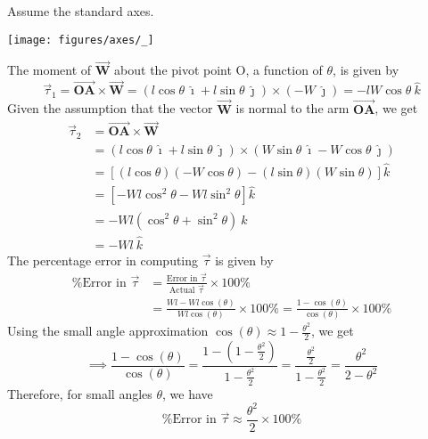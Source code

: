 Assume the standard axes.
\vspace{-2em}
\begin{center}
    \texttt{[image: figures/axes/\_]}
\end{center}
\vspace{-1em}
The moment of \( \vec{\mathbf{W}} \) about the pivot point O, a function of \( \theta \), is given by
\[
    \vec{\tau}_1 = \vec{\mathbf{OA}} \times \vec{\mathbf{W}}
    = (l \cos \theta \ \hat{\imath} + l \sin \theta \ \hat{\jmath}) \times (- W \ \hat{\jmath})
    = -lW \cos \theta \ \hat{k}
\]
Given the assumption that the vector \( \vec{\mathbf{W}} \) is normal to the arm \( \vec{\mathbf{OA}} \), we get
\begin{align*}
    \vec{\tau}_2 & = \vec{\mathbf{OA}} \times \vec{\mathbf{W}}                                                                                                                \\
                 & = \left(l \cos \theta \ \hat{\imath} + l \sin \theta \ \hat{\jmath}\right) \times \left(W \sin \theta \ \hat{\imath} - W \cos \theta \ \hat{\jmath}\right) \\
                 & = \left[(l \cos \theta)(-W \cos \theta) - (l \sin \theta)(W \sin \theta)\right] \hat{k}                                                                    \\
                 & = \left[-W l \cos^2 \theta - W l \sin^2 \theta\right] \hat{k}                                                                                              \\
                 & = -W l (\cos^2 \theta + \sin^2 \theta) \ \hat{k}                                                                                                           \\
                 & = -W l \ \hat{k}
\end{align*}
The percentage error in computing \( \vec{\tau} \) is given by
\begin{align*}
    \text{\%Error in } \vec{\tau}
     & =
    \frac{\text{Error in }\vec{\tau}}{\text{Actual }\vec{\tau}} \times 100\% \\
     & = \frac{W l - W l \cos(\theta)}{W l \cos(\theta)} \times 100\%
    = \frac{1 - \cos(\theta)}{\cos(\theta)} \times 100\%
\end{align*}
Using the small angle approximation \( \cos(\theta) \approx 1 - \frac{\theta^2}{2} \), we get
\[
    \implies \frac{1 - \cos(\theta)}{\cos(\theta)}
    = \frac{1 - (1 - \frac{\theta^2}{2})}{1 - \frac{\theta^2}{2}}
    = \frac{\frac{\theta^2}{2}}{1 - \frac{\theta^2}{2}}
    = \frac{\theta^2}{2 - \theta^2}
\]
Therefore, for small angles \( \theta \), we have
\[
    \boxed{
        \text{\%Error in } \vec{\tau} \approx \frac{\theta^2}{2} \times 100\%
    }
\]
